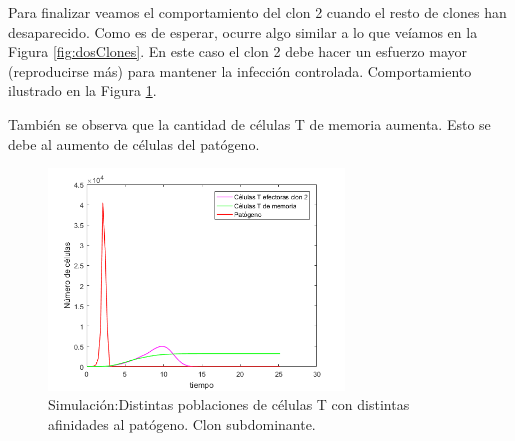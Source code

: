 Para finalizar veamos el comportamiento del clon 2 cuando el resto de clones han desaparecido. Como es de esperar, ocurre algo similar a lo que veíamos en la Figura \ref{fig:dosClones}. En este caso el clon 2 debe hacer un esfuerzo mayor (reproducirse más) para mantener la infección controlada. Comportamiento ilustrado en la Figura \ref{fig:unClon}.

También se observa que la cantidad de células T de memoria aumenta. Esto se debe al aumento de células del patógeno. 


\begin{figure}[t]
	\centering
	\includegraphics[width=0.7\textwidth]{Imagenes/Simulaciones/unClon}
	\caption{Simulación:Distintas poblaciones de células T con distintas afinidades al patógeno. Clon subdominante.}
	\label{fig:unClon}
\end{figure}

